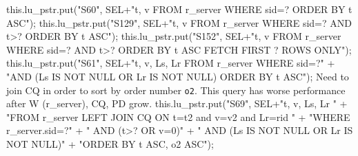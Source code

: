 this.lu_pstr.put("S60", SEL+"t, v FROM r_server WHERE sid=? ORDER BY t ASC");
\eatline
{}\nwendcode{}\endmoddef{}
this.lu_pstr.put("S129", SEL+"t, v FROM r_server WHERE sid=? AND t>? ORDER BY t ASC");
\eatline
{}\nwendcode{}\endmoddef{}
this.lu_pstr.put("S152", SEL+"t, v FROM r_server WHERE sid=? AND t>? ORDER BY t ASC FETCH FIRST ? ROWS ONLY");
\eatline
{}\nwendcode{}\endmoddef{}
this.lu_pstr.put("S61", SEL+"t, v, Ls, Lr FROM r_server WHERE sid=?"
      + "AND (Ls IS NOT NULL OR Lr IS NOT NULL) ORDER BY t ASC");
\eatline
{}\nwendcode{}Need to join CQ in order to sort by order number {\tt{}o2}. This query has
worse performance after W (r\_server), CQ, PD grow.
\nwenddocs{}\endmoddef{}
this.lu_pstr.put("S69", SEL+"t, v, Ls, Lr "
      + "FROM r_server LEFT JOIN CQ ON t=t2 and v=v2 and Lr=rid "
      + "WHERE r_server.sid=?"
      + "   AND (t>? OR v=0)"
      + "   AND (Ls IS NOT NULL OR Lr IS NOT NULL)"
      + "ORDER BY t ASC, o2 ASC");
\eatline
{}\nwendcode{}\endmoddef{}

